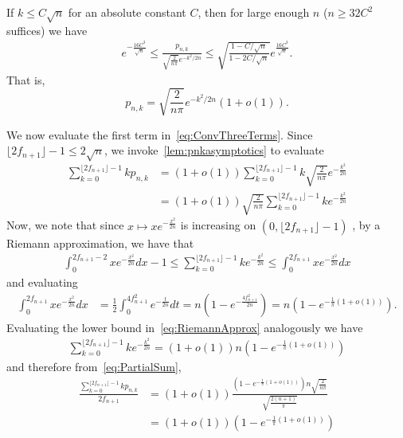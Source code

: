     \begin{lemma}\label{lem:pnkasymptotics}
        If $k \le C\sqrt{n}$ for an absolute constant $C$, then for large enough $n$ ($n \ge 32C^2$ suffices) we have
        \begin{align}\label{eq:pnkDensityApprox}
            e^{-\frac{16C^3}{\sqrt{n}}} \le \frac{p_{n,k}}{\sqrt{\frac{2}{n\pi}}e^{-k^2/2n}} \le \sqrt{\frac{1-C/\sqrt{n}}{1-2C/\sqrt{n}}} e^{\frac{16C^3}{\sqrt{n}}}.
        \end{align}
        That is,
        \[
        p_{n,k} = \sqrt{\frac{2}{n\pi}}e^{-k^2/2n} (1+o(1)).
        \]
    \end{lemma}
    We now evaluate the first term in~\cref{eq:ConvThreeTerms}. Since $\lfloor 2f_{n+1} \rfloor - 1 \le 2\sqrt{n}$, we invoke~\cref{lem:pnkasymptotics} to evaluate 
    \begin{align}
        \sum_{k=0}^{\lfloor 2f_{n+1} \rfloor-1} kp_{n,k} &=    (1+o(1))\sum_{k=0}^{\lfloor 2f_{n+1} \rfloor-1} k \sqrt{\frac{2}{n\pi}} e^{-\frac{k^2}{2n}} \\
        &= (1+o(1)) \sqrt{\frac{2}{n\pi}} \sum_{k=0}^{\lfloor 2f_{n+1} \rfloor-1} k e^{-\frac{k^2}{2n}} \label{eq:PartialSum}
    \end{align}
    Now, we note that since $x \mapsto xe^{-\frac{x^2}{2n}}$ is increasing on $(0,\lfloor 2f_{n+1} \rfloor-1)$ %
    , by a Riemann approximation, we have that 
    \begin{align} \label{eq:RiemannApprox}
    \int_{0}^{2f_{n+1}-2} x e^{-\frac{x^2}{2n}} dx - 1 \le\sum_{k=0}^{\lfloor 2f_{n+1} \rfloor-1} k e^{-\frac{k^2}{2n}} \le \int_{0}^{2f_{n+1}} x e^{-\frac{x^2}{2n}} dx 
    \end{align}
    and evaluating
    \begin{align}
        \int_{0}^{2f_{n+1}} x e^{-\frac{x^2}{2n}} dx &= \frac{1}{2} \int_{0}^{4f_{n+1}^2} e^{-\frac{t}{2n}} dt = n\left(1-e^{-\frac{4f_{n+1}^2}{2n}}\right) = n\left(1-e^{-\frac{1}{\pi}(1+o(1))}\right).
    \end{align}
    Evaluating the lower bound in~\cref{eq:RiemannApprox} analogously we have 
    \begin{align}\label{eq:ExptZCLowRegime}
        \sum_{k=0}^{\lfloor 2f_{n+1} \rfloor-1} k e^{-\frac{k^2}{2n}} = (1+o(1)) n\left(1-e^{-\frac{1}{\pi}(1+o(1))}\right)
    \end{align}
    and therefore from~\cref{eq:PartialSum}, 
    \begin{align}
        \frac{\sum_{k=0}^{\lfloor 2f_{n+1} \rfloor-1} k p_{n,k}}{2f_{n+1}} &= (1+o(1))\frac{\left(1-e^{-\frac{1}{\pi}(1+o(1))}\right) n \sqrt{\frac{2}{n \pi}}}{\sqrt{\frac{2(n+1)}{\pi}}} \nonumber\\
      &= (1+o(1))\left(1-e^{-\frac{1}{\pi}(1+o(1))}\right) \label{eq:LittleOPartialSum}
    \end{align}
